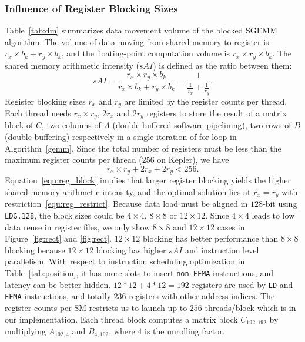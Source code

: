 \subsubsection{Influence of Register Blocking Sizes}
Table~\ref{tab:dm} summarizes data movement volume of the blocked SGEMM algorithm.
The volume of data moving from shared memory to register is $r_x\times b_k+ r_y\times b_k$, 
and the floating-point computation volume is $r_x\times r_y\times b_k$. 
The shared memory arithmetic intensity ($sAI$) is defined as the ratio between them:
{\footnotesize
\begin{equation}
sAI = \frac {r_x\times 
r_y\times b_k} {r_x\times b_k+ r_y\times b_k} = \frac{1}{\frac{1}{r_x} + \frac{1}{r_y}}.
    \label{equ:reg_block}
\end{equation}
}
Register blocking sizes $r_x$ and $r_y$ are limited by the register counts per thread. 
Each thread needs $r_x\times r_y$, $2r_x$ and $2r_y$ registers to store the result of a matrix block of $C$,  two columns of $A$ (double-buffered software pipelining),  two rows of $B$ (double-buffering) respectively in a single iteration of for loop in Algorithm~\ref{gemm}.
Since the total number of registers must be less than the maximum register counts per thread ($256$ on Kepler), we have
{\footnotesize
\begin{equation}
    r_x\times r_y + 2r_x + 2r_y < 256.
\label{equ:reg_restrict}
\end{equation}
}
Equation~\ref{equ:reg_block} implies that larger register blocking yields the higher shared memory arithmetic intensity,
and the optimal solution lies at $r_x=r_y$ with restriction~\ref{equ:reg_restrict}. 
Because data load must be aligned in $128$-bit using 
{\tt LDG.128}, the block sizes could be $4\times 4$, $8\times 8$ or $12\times 12$. 
Since $4\times 4$ leads to low data reuse in register files, we only show $8\times8$ and $12\times12$ cases in Figure~\ref{fig:rect} and \ref{fig:rect}.
$12\times12$ blocking has better performance than $8\times8$ blocking because $12\times12$ blocking has higher $sAI$ and instruction level parallelism. 
With respect to instruction scheduling optimization in Table~\ref{tab:position}, it has more slots to insert {\tt non-FFMA} instructions, and latency can be better hidden.
$12*12+4*12=192$ registers are used by {\tt LD} and {\tt FFMA} instructions, and totally $236$ registers with other address indices. 
The register counts per SM restricts us to launch up to $256$ threads/block which is in our implementation. 
Each thread block computes a matrix block $C_{192, 192}$ by multiplying $A_{192,4}$ and $B_{4, 192}$, where $4$ is the unrolling factor.

